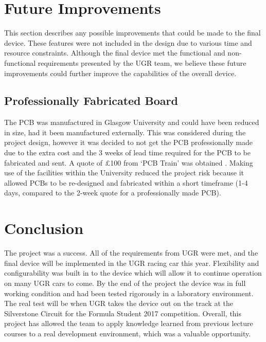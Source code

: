 \documentclass[a4paper,12pt]{article}
\begin{document}
\newpage
\section{Future Improvements}
\label{sec:future_improvements}

This section describes any possible improvements that could be made to the final device. These features were not included in the design due to various time and resource constraints. Although the final device met the functional and non-functional requirements presented by the UGR team, we believe these future improvements could further improve the capabilities of the overall device.

\subsection{Professionally Fabricated Board}
\label{sec:future_improvement_1}

The PCB was manufactured in Glasgow University and could have been reduced in size, had it been manufactured externally. This was considered during the project design, however it was decided to not get the PCB professionally made due to the extra cost and the 3 weeks of lead time required for the PCB to be fabricated and sent. A quote of \pounds100 from ‘PCB Train’ was obtained \cite{pcb_train}. Making use of the facilities within the University reduced the project risk because it allowed PCBs to be re-designed and fabricated within a short timeframe (1-4 days, compared to the 2-week quote for a professionally made PCB).


\section{Conclusion}
\label{sec:conclusion}

The project was a success. All of the requirements from UGR were met, and the final device will be implemented in the UGR racing car this year. Flexibility and configurability was built in to the device which will allow it to continue operation on many UGR cars to come. By the end of the project the device was in full working condition and had been tested rigorously in a laboratory environment. The real test will be when UGR takes the device out on the track at the Silverstone Circuit for the Formula Student 2017 competition. Overall, this project has allowed the team to apply knowledge learned from previous lecture courses to a real development environment, which was a valuable opportunity.
\end{document}
